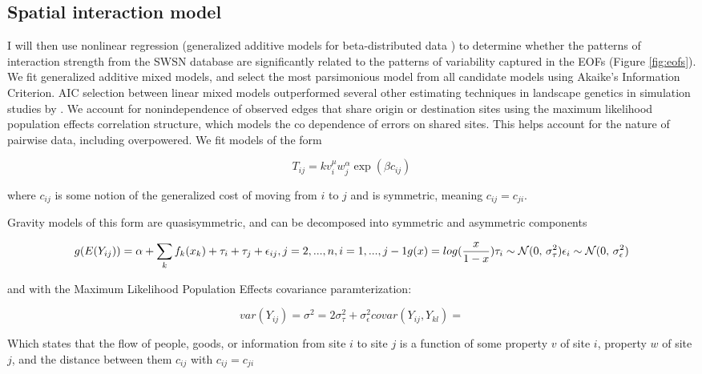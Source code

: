 \documentclass[fleqn,10pt]{wlscirep}
\begin{document}
\subsection*{Spatial interaction model}
I will then use nonlinear regression (generalized additive models for beta-distributed data \cite{Wood2006a}) to determine whether the patterns of interaction strength from the SWSN database are significantly related to the patterns of variability captured in the EOFs (Figure \ref{fig:eofs}).
We fit generalized additive mixed models, and select the most parsimonious model from all candidate models using Akaike's Information Criterion. AIC selection between linear mixed models outperformed several other estimating techniques in landscape genetics in simulation studies by \cite{Shirk et al 2018}. We account for nonindependence of observed edges that share origin or destination sites using the maximum likelihood population effects correlation structure, which models the co dependence of errors on shared sites. This helps account for the nature of pairwise data, including overpowered.
We fit models of the form

$$T_{ij} = k v_i^\mu w_j^\alpha \exp(\beta c_{ij})$$

where $c_{ij}$ is some notion of the generalized cost of moving from $i$ to $j$ and is symmetric, meaning $c_{ij} = c_{ji}$.

Gravity models of this form are quasisymmetric, and can be decomposed into symmetric and asymmetric components

\begin{equation}
    g(E(Y_{ij})) = \alpha + \sum_k f_k(x_k) + \tau_i + \tau_j + \epsilon_{ij}, j = 2, ..., n, i = 1, ..., j - 1\\
    g(x) = log(\frac{x}{1-x})\\
    \tau_i \sim \mathcal{N}(0,\,\sigma^{2}_{\tau})\\
    \epsilon_i \sim \mathcal{N}(0,\,\sigma^{2}_{\epsilon})
\end{equation}

and with the Maximum Likelihood Population Effects covariance paramterization:

\begin{equation}
    var(Y_{ij}) = \sigma^2 = 2\sigma^{2}_{\tau} + \sigma^{2}_{\epsilon}
    covar(Y_{ij}, Y_{kl}) =  
\end{equation}

Which states that the flow of people, goods, or information from site $i$ to site $j$ is a function of some property $v$ of site $i$, property $w$ of site $j$, and the distance between them $c_{ij}$ with $c_{ij} = c_{ji}$
\end{document}
